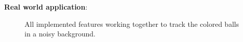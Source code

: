\documentclass{sciposter}
\begin{document}
\begin{multicols}{3}
\textbf{Real world application}:

\begin{figure}[!h]
	\centering
			\setlength{\fboxsep}{1pt}
			\setlength{\fboxrule}{1pt}
	\caption{All implemented features working together to track the colored balls in a noisy background.}
	\label{fig:miguel_1}
\end{figure}


\end{multicols}
\end{document}
